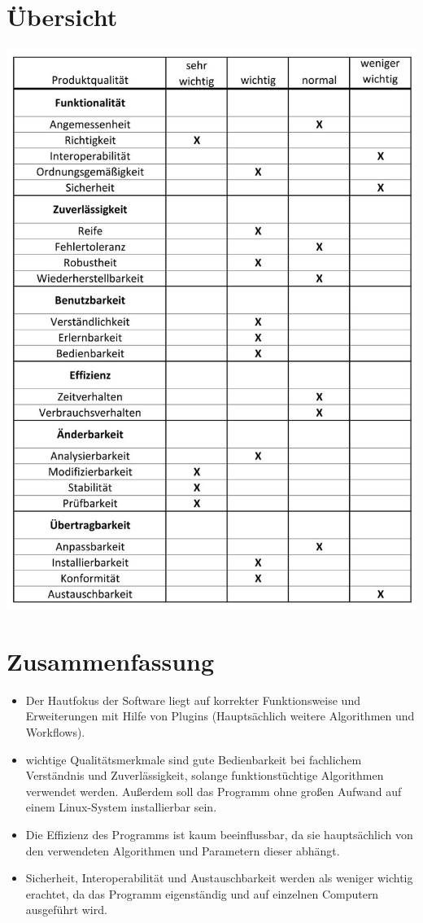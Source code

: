 \section{Übersicht}
\includegraphics[scale=0.5]{img/Quali.jpg} 
\section{Zusammenfassung}
\begin{itemize}
\item Der Hautfokus der Software liegt auf korrekter Funktionsweise und Erweiterungen mit Hilfe von Plugins (Hauptsächlich weitere Algorithmen und Workflows).  
\item wichtige Qualitätsmerkmale sind gute Bedienbarkeit bei fachlichem Verständnis und Zuverlässigkeit, solange funktionstüchtige Algorithmen verwendet werden. Außerdem soll das Programm ohne großen Aufwand auf einem Linux-System installierbar sein.
\item Die Effizienz des Programms ist kaum beeinflussbar, da sie hauptsächlich von den verwendeten Algorithmen und Parametern dieser abhängt.
\item Sicherheit, Interoperabilität und Austauschbarkeit werden als weniger wichtig erachtet, da das Programm eigenständig und auf einzelnen Computern ausgeführt wird.
\end{itemize}